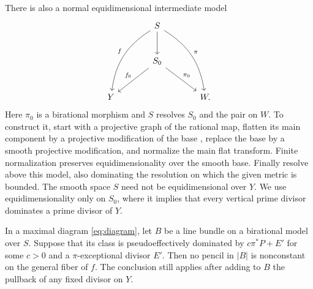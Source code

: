 There is also a normal equidimensional intermediate model
\begin{equation}\label{eq:intermediate}
\begin{tikzcd}[row sep=large,column sep=large]
& S \arrow[d] \arrow[ddl,bend right=25,"f"'] \arrow[ddr,bend left=25,"\pi"] &\\
& S_0 \arrow[dl,"f_0"'] \arrow[dr,"\pi_0"] &\\
Y && W .
\end{tikzcd}
\end{equation}
Here $\pi_0$ is a birational morphism and $S$ resolves $S_0$ and the pair on $W$. To construct it, start with a projective graph of the rational map, flatten its main component by a projective modification of the base \cite{RaynaudGruson1971}, replace the base by a smooth projective modification, and normalize the main flat transform. Finite normalization preserves equidimensionality over the smooth base. Finally resolve above this model, also dominating the resolution on which the given metric is bounded. The smooth space $S$ need not be equidimensional over $Y$. We use equidimensionality only on $S_0$, where it implies that every vertical prime divisor dominates a prime divisor of $Y$.

\begin{lemma}\label{lem:pencil}
In a maximal diagram \eqref{eq:diagram}, let $B$ be a line bundle on a birational model over $S$. Suppose that its class is pseudoeffectively dominated by $c\pi^*P+E'$ for some $c>0$ and a $\pi$-exceptional divisor $E'$. Then no pencil in $|B|$ is nonconstant on the general fiber of $f$. The conclusion still applies after adding to $B$ the pullback of any fixed divisor on $Y$.
\end{lemma}

